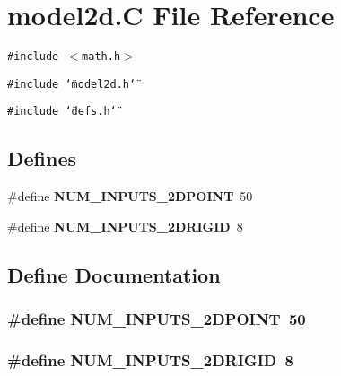 \section{model2d.C File Reference}
\label{model2d_8C}
{\tt \#include $<$math.h$>$}\par
{\tt \#include \char`\"{}model2d.h\char`\"{}}\par
{\tt \#include \char`\"{}defs.h\char`\"{}}\par
\subsection*{Defines}
\begin{CompactItemize}
\item 
\#define {\bf NUM\_\-INPUTS\_\-2DPOINT}\ 50
\item 
\#define {\bf NUM\_\-INPUTS\_\-2DRIGID}\ 8
\end{CompactItemize}


\subsection{Define Documentation}
\subsubsection{\setlength{\rightskip}{0pt plus 5cm}\#define NUM\_\-INPUTS\_\-2DPOINT\ 50}\label{model2d_8C_a0}


\subsubsection{\setlength{\rightskip}{0pt plus 5cm}\#define NUM\_\-INPUTS\_\-2DRIGID\ 8}\label{model2d_8C_a1}


